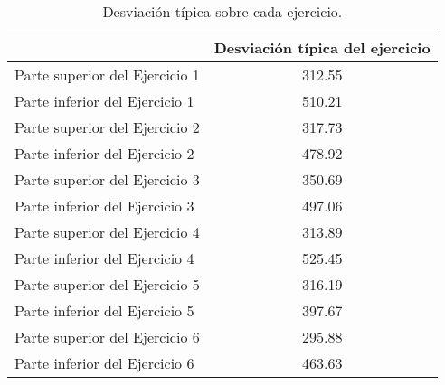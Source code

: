 \begin{table}[H]
\centering
\begin{tabular}{lc}
\hline
\rowcolor[HTML]{EFEFEF} 
\multicolumn{1}{c}{\cellcolor[HTML]{EFEFEF}\textbf{Ejercicio realizado}} & \multicolumn{1}{l}{\cellcolor[HTML]{EFEFEF}\textbf{Desviación típica del ejercicio}} \\ \hline
\rowcolor[HTML]{ECF4FF} 
Parte superior del Ejercicio 1                                           & 312.55                                                                               \\
\rowcolor[HTML]{EFEFEF} 
Parte inferior del Ejercicio 1                                           & 510.21                                                                               \\
\rowcolor[HTML]{ECF4FF} 
Parte superior del Ejercicio 2                                           & 317.73                                                                               \\
\rowcolor[HTML]{EFEFEF} 
Parte inferior del Ejercicio 2                                           & 478.92                                                                               \\
\rowcolor[HTML]{ECF4FF} 
Parte superior del Ejercicio 3                                           & 350.69                                                                               \\
\rowcolor[HTML]{EFEFEF} 
Parte inferior del Ejercicio 3                                           & 497.06                                                                               \\
\rowcolor[HTML]{ECF4FF} 
Parte superior del Ejercicio 4                                           & 313.89                                                                               \\
\rowcolor[HTML]{EFEFEF} 
Parte inferior del Ejercicio 4                                           & 525.45                                                                               \\
\rowcolor[HTML]{ECF4FF} 
Parte superior del Ejercicio 5                                           & 316.19                                                                               \\
\rowcolor[HTML]{EFEFEF} 
Parte inferior del Ejercicio 5                                           & 397.67                                                                               \\
\rowcolor[HTML]{ECF4FF} 
Parte superior del Ejercicio 6                                           & 295.88                                                                               \\
\rowcolor[HTML]{EFEFEF} 
Parte inferior del Ejercicio 6                                           & 463.63                                                                               \\ \hline
\end{tabular}
\caption{Desviación típica sobre cada ejercicio.}
\label{tab:ClasificacionEj2}
\end{table}

